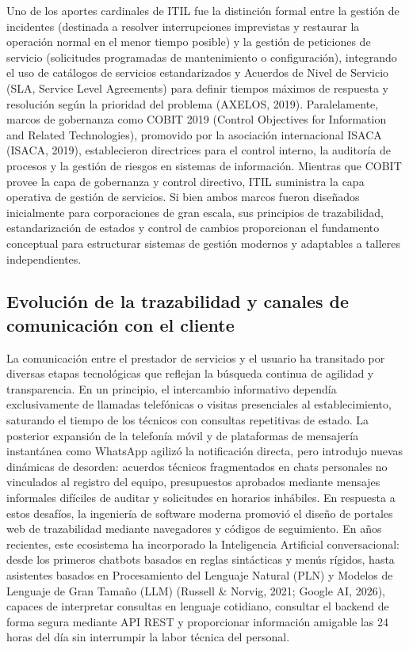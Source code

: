 Uno de los aportes cardinales de ITIL fue la distinción formal entre la gestión de incidentes (destinada a resolver interrupciones imprevistas y restaurar la operación normal en el menor tiempo posible) y la gestión de peticiones de servicio (solicitudes programadas de mantenimiento o configuración), integrando el uso de catálogos de servicios estandarizados y Acuerdos de Nivel de Servicio (SLA, Service Level Agreements) para definir tiempos máximos de respuesta y resolución según la prioridad del problema (AXELOS, 2019). Paralelamente, marcos de gobernanza como COBIT 2019 (Control Objectives for Information and Related Technologies), promovido por la asociación internacional ISACA (ISACA, 2019), establecieron directrices para el control interno, la auditoría de procesos y la gestión de riesgos en sistemas de información. Mientras que COBIT provee la capa de gobernanza y control directivo, ITIL suministra la capa operativa de gestión de servicios. Si bien ambos marcos fueron diseñados inicialmente para corporaciones de gran escala, sus principios de trazabilidad, estandarización de estados y control de cambios proporcionan el fundamento conceptual para estructurar sistemas de gestión modernos y adaptables a talleres independientes.

\subsection{Evolución de la trazabilidad y canales de comunicación con el cliente}

La comunicación entre el prestador de servicios y el usuario ha transitado por diversas etapas tecnológicas que reflejan la búsqueda continua de agilidad y transparencia. En un principio, el intercambio informativo dependía exclusivamente de llamadas telefónicas o visitas presenciales al establecimiento, saturando el tiempo de los técnicos con consultas repetitivas de estado. La posterior expansión de la telefonía móvil y de plataformas de mensajería instantánea como WhatsApp agilizó la notificación directa, pero introdujo nuevas dinámicas de desorden: acuerdos técnicos fragmentados en chats personales no vinculados al registro del equipo, presupuestos aprobados mediante mensajes informales difíciles de auditar y solicitudes en horarios inhábiles. En respuesta a estos desafíos, la ingeniería de software moderna promovió el diseño de portales web de trazabilidad mediante navegadores y códigos de seguimiento. En años recientes, este ecosistema ha incorporado la Inteligencia Artificial conversacional: desde los primeros chatbots basados en reglas sintácticas y menús rígidos, hasta asistentes basados en Procesamiento del Lenguaje Natural (PLN) y Modelos de Lenguaje de Gran Tamaño (LLM) (Russell \& Norvig, 2021; Google AI, 2026), capaces de interpretar consultas en lenguaje cotidiano, consultar el backend de forma segura mediante API REST y proporcionar información amigable las 24 horas del día sin interrumpir la labor técnica del personal.